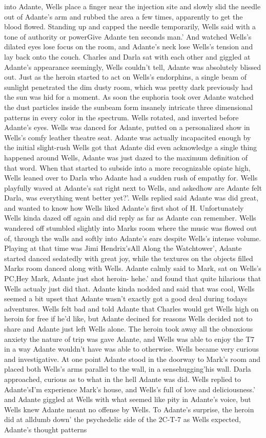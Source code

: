 \documentclass[12pt]{book}
\begin{document}
into Adante, Wells place a finger near the injection site and slowly slid the needle out of Adante's arm and rubbed the area a few times, apparently to get the blood flowed. Standing up and capped the needle temporarily, Wells said with a tone of authority or powerGive Adante ten seconds man.' And watched Wells's dilated eyes lose focus on the room, and Adante's neck lose Wells's tension and lay back onto the couch. Charles and Darla sat with each other and giggled at Adante's appearance seemingly, Wells couldn't tell, Adante was absolutely blissed out. Just as the heroin started to act on Wells's endorphins, a single beam of sunlight penetrated the dim dusty room, which was pretty dark previously had the sun was hid for a moment. As soon the euphoria took over Adante watched the dust particles inside the sunbeam form insanely intricate three dimensional patterns in every color in the spectrum. Wells rotated, and inverted before Adante's eyes. Wells was danced for Adante, putted on a personalized show in Wells's comfy leather theatre seat. Adante was actually incapacited enough by the initial slight-rush Wells got that Adante did even acknowledge a single thing happened around Wells, Adante was just dazed to the maximum definition of that word. When that started to subside into a more recognizable opiate high, Wells leaned over to Darla who Adante had a sudden rush of empathy for. Wells playfully waved at Adante's sat right next to Wells, and askedhow are Adante felt Darla, was everything went better yet?'. Wells replied said Adante was did great, and wanted to know how Wells liked Adante's first shot of H. Unfortunately Wells kinda dazed off again and did reply as far as Adante can remember. Wells wandered off stumbled slightly into Marks room where the music was flowed out of, through the walls and softly into Adante's ears despite Wells's intense volume. Playing at that time was Jimi Hendrix'sAll Along the Watchtower', Adante started danced sedatedly with great joy, while the textures on the objects filled Marks room danced along with Wells. Adante calmly said to Mark, sat on Wells's PC,Hey Mark, Adante just shot heroin- hehe.' and found that quite hilarious that Wells actualy just did that. Adante kinda nodded and said that was cool, Wells seemed a bit upset that Adante wasn't exactly got a good deal during todays adventures. Wells felt bad and told Adante that Charles would get Wells high on heroin for free if he'd like, but Adante decined for reasons Wells decided not to share and Adante just left Wells alone. The heroin took away all the obnoxious anxiety the nature of trip was gave Adante, and Wells was able to enjoy the T7 in a way Adante wouldn't have was able to otherwise. Wells became very curious and investigative. At one point Adante stood in the doorway to Mark's room and placed both Wells's arms parallel to the wall, in a sensehugging'his wall. Darla approached, curious as to what in the hell Adante was did. Wells replied to Adante'sI'm experience Mark's house, and Wells's full of love and deliciousness.' and Adante giggled at Wells with what seemed like pity in Adante's voice, but Wells knew Adante meant no offense by Wells. To Adante's surprise, the heroin did at alldumb down' the psychedelic side of the 2C-T-7 as Wells expected, Adante's thought patterns 
\end{document}
